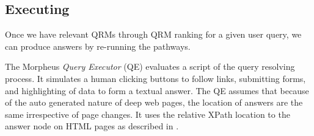 \subsection{Executing} 

Once we have relevant QRMs through QRM ranking for a given user query, we can produce answers by re-running the pathways.

The Morpheus \emph{Query Executor} (QE) evaluates a script of the query resolving process.  It simulates a human clicking buttons to follow links, submitting forms, and highlighting of data to form a textual answer.  The QE assumes that because of the auto generated nature of deep web pages, the location of answers are the same irrespective of page changes.  It uses the relative XPath location to the answer node on HTML pages as described in \cite{Badica06}.




